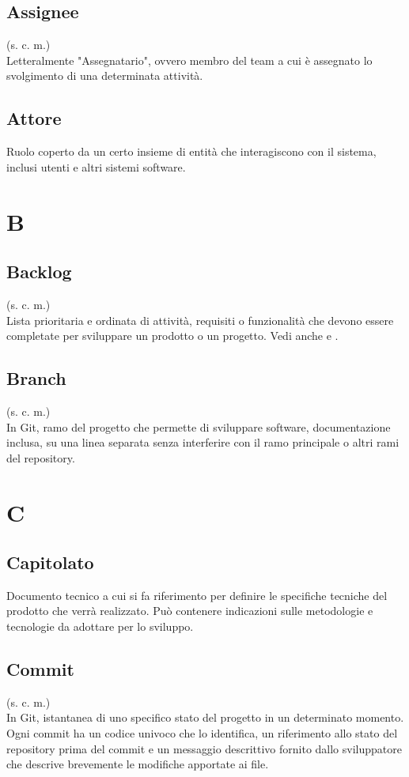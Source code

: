     \subsection{Assignee}
    (s. c. m.)\\
    Letteralmente "Assegnatario", ovvero membro del team a cui è assegnato lo
    svolgimento di una determinata attività.
    \subsection{Attore}
    Ruolo coperto da un certo insieme di entità che interagiscono con il sistema, 
    inclusi utenti e altri sistemi software.
\pagebreak
\section{B}
    \subsection{Backlog}
    (s. c. m.)\\
    Lista prioritaria e ordinata di attività, requisiti o funzionalità che devono 
    essere completate per sviluppare un prodotto o un progetto.
    Vedi anche  e .
    \subsection{Branch} 
    (s. c. m.)\\
    In Git, ramo del progetto che permette di sviluppare software, documentazione inclusa, su una linea separata 
    senza interferire con il ramo principale o altri rami del repository.
\pagebreak
\section{C}
    \subsection{Capitolato}
    Documento tecnico a cui si fa riferimento per definire le specifiche tecniche 
    del prodotto che verrà realizzato. Può contenere indicazioni sulle metodologie e
    tecnologie da adottare per lo sviluppo.
    \subsection{Commit}
    (s. c. m.)\\
    In Git, istantanea di uno specifico stato del progetto in un determinato momento.
    Ogni commit ha un codice univoco che lo identifica,
    un riferimento allo stato del repository prima del commit e un messaggio descrittivo 
    fornito dallo sviluppatore che descrive brevemente le modifiche apportate ai file.
